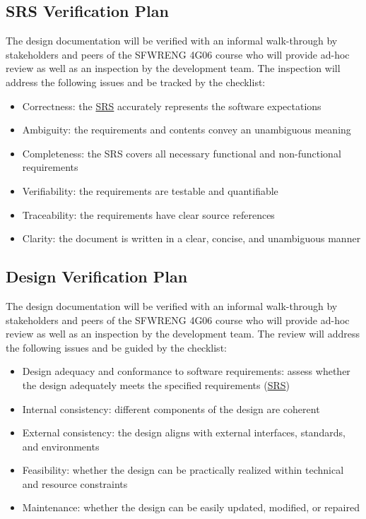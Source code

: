 \documentclass[12pt, titlepage]{article}
\begin{document}
\subsection{SRS Verification Plan}
The design documentation will be verified with an informal walk-through by stakeholders and peers of the SFWRENG 4G06 course who will provide ad-hoc review as well as an inspection by the development team. The inspection will address the following issues and be tracked by the checklist:
\begin{itemize}
    \item Correctness: the \href{https://github.com/r-yeh/grocery-spending-tracker/blob/master/docs/SRS/SRS.pdf}{SRS} accurately represents the software expectations
    \item Ambiguity: the requirements and contents convey an unambiguous meaning
    \item Completeness: the SRS covers all necessary functional and non-functional requirements
    \item Verifiability: the requirements are testable and quantifiable
    \item Traceability: the requirements have clear source references
    \item Clarity: the document is written in a clear, concise, and unambiguous manner
\end{itemize}

\subsection{Design Verification Plan}
The design documentation will be verified with an informal walk-through by stakeholders and peers of the SFWRENG 4G06 course who will provide ad-hoc review as well as an inspection by the development team. The review will address the following issues and be guided by the checklist:
\begin{itemize}
    \item Design adequacy and conformance to software requirements: assess whether the design adequately meets the specified requirements (\href{https://github.com/r-yeh/grocery-spending-tracker/blob/master/docs/SRS/SRS.pdf}{SRS})
    \item Internal consistency: different components of the design are coherent
    \item External consistency: the design aligns with external interfaces, standards, and environments
    \item Feasibility: whether the design can be practically realized within technical and resource constraints
    \item Maintenance: whether the design can be easily updated, modified, or repaired
\end{itemize}
\end{document}
